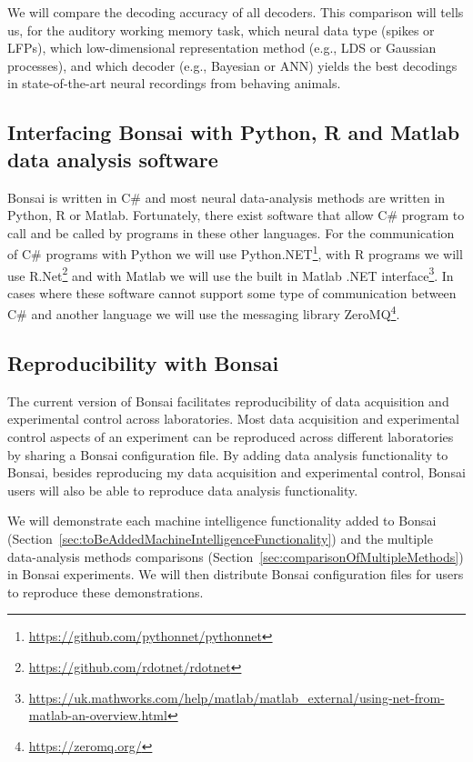 \documentclass[a4paper,11point]{article}
\begin{document}
We will compare the decoding accuracy of all decoders. This comparison will
tells us, for the auditory working memory task, which neural data type (spikes
or LFPs), which low-dimensional representation method (e.g., LDS or Gaussian
processes), and which decoder (e.g., Bayesian or ANN) yields the best decodings
in state-of-the-art neural recordings from behaving animals.

\subsection{Interfacing Bonsai with Python, R and Matlab data analysis software}
\label{sec:bonsaiPythonMatlabCommunication}

Bonsai is written in C\# and most neural data-analysis methods are written in
Python, R or Matlab. Fortunately, there exist software that allow C\# program
to call and be called by programs in these other languages. For the
communication of C\# programs with Python we will use
Python.NET\footnote{\href{https://github.com/pythonnet/pythonnet}{https://github.com/pythonnet/pythonnet}},
with R programs we will use
R.Net\footnote{\href{https://github.com/rdotnet/rdotnet}{https://github.com/rdotnet/rdotnet}}
and with Matlab we will use the built in Matlab .NET
interface\footnote{\href{https://uk.mathworks.com/help/matlab/matlab\_external/using-net-from-matlab-an-overview.html}{https://uk.mathworks.com/help/matlab/matlab\_external/using-net-from-matlab-an-overview.html}}.
In cases where these software cannot support some type of communication between
C\# and another language we will use the messaging library
ZeroMQ\footnote{\href{https://zeromq.org/}{https://zeromq.org/}}.

\subsection{Reproducibility with Bonsai}
\label{sec:reproducibility}

The current version of Bonsai facilitates reproducibility of data acquisition
and experimental control across laboratories. Most data acquisition and
experimental control aspects of an experiment can be reproduced across
different laboratories by sharing a Bonsai configuration file.
%
By adding data analysis functionality to Bonsai, besides reproducing my data
acquisition and experimental control, Bonsai users will also be able to reproduce
data analysis functionality.

We will demonstrate each machine intelligence functionality added to Bonsai
(Section~\ref{sec:toBeAddedMachineIntelligenceFunctionality}) and the multiple
data-analysis methods comparisons
(Section~\ref{sec:comparisonOfMultipleMethods}) in Bonsai experiments. We will
then distribute Bonsai configuration files for users to reproduce these
demonstrations.
\end{document}
